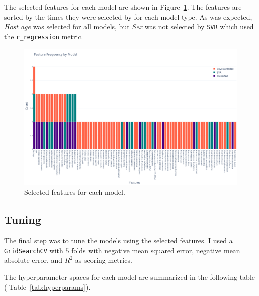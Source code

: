 \documentclass[12pt]{article}
\begin{document}
The selected features for each model are shown in Figure~\ref{fig:selected_features}.
The features are sorted by the times they were selected by for each model type. As
was expected, \textit{Host age} was selected for all models, but \textit{Sex} was
not selected by \texttt{SVR} which used the \texttt{r\_regression} metric.

\begin{figure}[H]
    \centering
    \includegraphics[width=\textwidth]{ims/selected_features.png}
    \caption{Selected features for each model. }
    \label{fig:selected_features}
\end{figure}


\subsection{Tuning}
The final step was to tune the models using the selected features. I used a
\texttt{GridSearchCV} with $5$ folds with negative mean squared error, negative
mean absolute error, and $R^2$ as scoring metrics.

The hyperparameter spaces for each model are summarized in the following table (%
Table~\ref{tab:hyperparams}).
    
\end{document}
